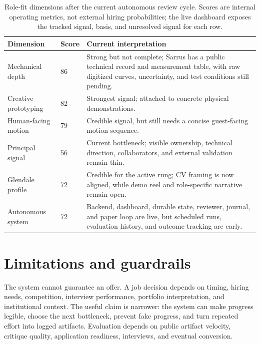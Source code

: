 \documentclass[12pt,letterpaper]{article}
\begin{document}
\begin{table}[tbp]
\centering
\small
\caption{Role-fit dimensions after the current autonomous review cycle. Scores are internal operating metrics, not external hiring probabilities; the live dashboard exposes the tracked signal, basis, and unresolved signal for each row.}
\label{tab:dimensions}
\begin{tabularx}{\textwidth}{L{0.34\textwidth}L{0.14\textwidth}Y}
\toprule
{}
\textbf{Dimension} & \textbf{Score} & \textbf{Current interpretation} \\
\midrule
Mechanical depth & 86 & Strong but not complete; Sarrus has a public technical record and measurement table, with raw digitized curves, uncertainty, and test conditions still pending. \\
Creative prototyping & 82 & Strongest signal; attached to concrete physical demonstrations. \\
Human-facing motion & 79 & Credible signal, but still needs a concise guest-facing motion sequence. \\
Principal signal & 56 & Current bottleneck; visible ownership, technical direction, collaborators, and external validation remain thin. \\
Glendale profile & 72 & Credible for the active rung; CV framing is now aligned, while demo reel and role-specific narrative remain open. \\
Autonomous system & 72 & Backend, dashboard, durable state, reviewer, journal, and paper loop are live, but scheduled runs, evaluation history, and outcome tracking are early. \\
\bottomrule
\end{tabularx}
\end{table}

\section{Limitations and guardrails}

The system cannot guarantee an offer. A job decision depends on timing, hiring needs, competition, interview performance, portfolio interpretation, and institutional context. The useful claim is narrower: the system can make progress legible, choose the next bottleneck, prevent fake progress, and turn repeated effort into logged artifacts. Evaluation depends on public artifact velocity, critique quality, application readiness, interviews, and eventual conversion.
\end{document}
